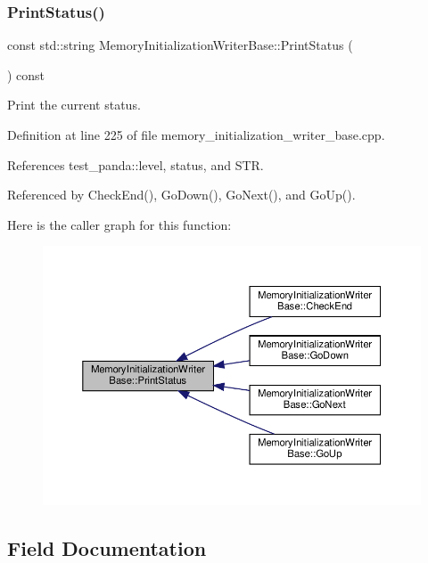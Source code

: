 \subsubsection{\texorpdfstring{Print\+Status()}{PrintStatus()}}
{\footnotesize\ttfamily const std\+::string Memory\+Initialization\+Writer\+Base\+::\+Print\+Status (\begin{DoxyParamCaption}{ }\end{DoxyParamCaption}) const\hspace{0.3cm}{\ttfamily [protected]}}



Print the current status. 



Definition at line 225 of file memory\+\_\+initialization\+\_\+writer\+\_\+base.\+cpp.



References test\+\_\+panda\+::level, status, and S\+TR.



Referenced by Check\+End(), Go\+Down(), Go\+Next(), and Go\+Up().

Here is the caller graph for this function\+:
\nopagebreak
\begin{figure}[H]
\begin{center}
\leavevmode
\includegraphics[width=350pt]{d3/d26/classMemoryInitializationWriterBase_aff08e4a2fa61dbb92047774c680db0b7_icgraph}
\end{center}
\end{figure}


\subsection{Field Documentation}
\mbox{\label{classMemoryInitializationWriterBase_ae5f60dc91641447c00b023836743b6b3}} 
